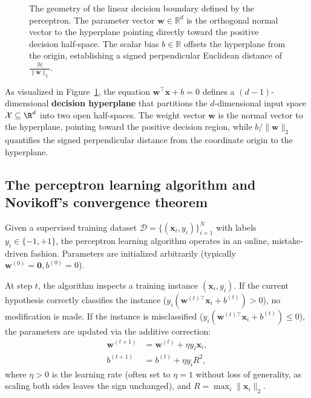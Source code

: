 \begin{figure}[H]
\caption{The geometry of the linear decision boundary defined by the perceptron. The parameter vector $\mathbf{w} \in \mathbb{R}^d$ is the orthogonal normal vector to the hyperplane pointing directly toward the positive decision half-space. The scalar bias $b \in \mathbb{R}$ offsets the hyperplane from the origin, establishing a signed perpendicular Euclidean distance of $\frac{|b|}{\|\mathbf{w}\|_2}$.}
\label{fig:hyperplane_geometry}
\end{figure}

As visualized in Figure~\ref{fig:hyperplane_geometry}, the equation $\mathbf{w}^\top \mathbf{x} + b = 0$ defines a $(d-1)$-dimensional \textbf{decision hyperplane} that partitions the $d$-dimensional input space $\mathcal{X} \subseteq \R^d$ into two open half-spaces. The weight vector $\mathbf{w}$ is the normal vector to the hyperplane, pointing toward the positive decision region, while $b / \|\mathbf{w}\|_2$ quantifies the signed perpendicular distance from the coordinate origin to the hyperplane.

\subsection{The perceptron learning algorithm and Novikoff's convergence theorem}
\label{sec:perceptron_learning_algorithm}

Given a supervised training dataset $\mathcal{D} = \{(\mathbf{x}_i, y_i)\}_{i=1}^N$ with labels $y_i \in \{-1, +1\}$, the perceptron learning algorithm operates in an online, mistake-driven fashion. Parameters are initialized arbitrarily (typically $\mathbf{w}^{(0)} = \mathbf{0}, b^{(0)} = 0$).

At step $t$, the algorithm inspects a training instance $(\mathbf{x}_i, y_i)$. If the current hypothesis correctly classifies the instance ($y_i (\mathbf{w}^{(t)\top} \mathbf{x}_i + b^{(t)}) > 0$), no modification is made. If the instance is misclassified ($y_i (\mathbf{w}^{(t)\top} \mathbf{x}_i + b^{(t)}) \le 0$), the parameters are updated via the additive correction:
\begin{align}
\mathbf{w}^{(t+1)} &= \mathbf{w}^{(t)} + \eta y_i \mathbf{x}_i, \label{eq:perceptron_update_w} \\
b^{(t+1)} &= b^{(t)} + \eta y_i R^2, \label{eq:perceptron_update_b}
\end{align}
where $\eta > 0$ is the learning rate (often set to $\eta = 1$ without loss of generality, as scaling both sides leaves the sign unchanged), and $R = \max_i \|\mathbf{x}_i\|_2$.

